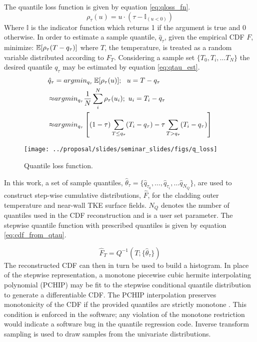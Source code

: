 The quantile loss function is given by equation \ref{eq:qloss_fn}.
\begin{equation}
\rho_\tau( u) =  u \cdot (\tau - \mathbb{I}_{( u < 0)})
\label{eq:qloss_fn}
\end{equation}
Where $\mathbb{I}$ is the indicator function which returns 1 if the argument is true and 0 otherwise.
In order to estimate a sample quantile, $\hat q_\tau$, given the empirical CDF $F$, minimize: $\operatorname*{\mathbb{E}}[\rho_\tau(T - q_\tau)]$ where $T$, the temperature, is treated as a random variable distributed according to $F_T$.  Considering a sample set $\{T_0, T_i, \dots T_N \}$ the desired quantile $q_\tau$ may be estimated by equation \ref{eq:qtau_est}.
\begin{equation}
            \left.\begin{aligned}
            \hat q_{\tau} &= argmin_{q_\tau} \operatorname*{\mathbb{E}}[\rho_\tau(u)];\ \  u = T - q_\tau  \\
            \approx & argmin_{q_\tau}  \frac{1}{N} \sum_i^N \rho_\tau(u_i); \ u_i = T_i - q_\tau \\
            \approx & argmin_{q_\tau} \left[ (1-\tau) \sum_{T \leq q_\tau}( T_i - q_\tau ) - \tau \sum_{T > q_\tau} (T_i - q_\tau) \right]
            \end{aligned}\right.
            \label{eq:qtau_est}
\end{equation}

\begin{figure}[H]
    \centering
    \texttt{[image: ../proposal/slides/seminar\_slides/figs/q\_loss]}
    \caption[Quantile loss function.]{Quantile loss function.}
    \label{fig:qloss}
\end{figure}

In this work, a set of sample quantiles, $\hat \theta_\tau = \{\hat q_{\tau_0}, \dots, \hat q_{\tau_i}, \dots \hat q_{N_Q} \}$, are used to construct step-wise cumulative distributions, $\hat F$, for the cladding outer temperature and near-wall TKE surface fields.  $N_Q$ denotes the number of quantiles used in the CDF reconstruction and is a user set parameter. The stepwise quantile function with prescribed quantiles is given by equation \ref{eq:cdf_from_qtau}.

\begin{equation}
\hat F_{T}= Q^{-1}(T; \{\hat{\theta}_{\tau} \})
\label{eq:cdf_from_qtau}
\end{equation}
The reconstructed CDF can then in turn be used to build a histogram.  In place of the stepwise representation, a monotone piecewise cubic hermite interpolating polynomial (PCHIP) may be fit to the stepwise conditional quantile distribution to generate a differentiable CDF.
The PCHIP interpolation preserves monotonicity of the CDF if the provided quantiles are strictly monotone \cite{Fritsch80}.  This condition is enforced in the software; any violation of the monotone restriction would indicate a software bug in the quantile regression code.  Inverse transform sampling is used to draw samples from the univariate distributions.

